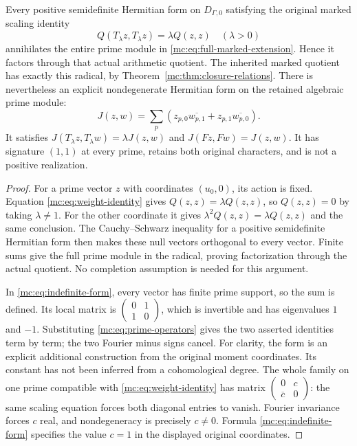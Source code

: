 \begin{proposition}
\label{mc:prop:positive-obstruction}
Every positive semidefinite Hermitian form on $D_{\Gamma,0}$
satisfying the original marked scaling identity
\[
 Q(T_\lambda z,T_\lambda z)=\lambda Q(z,z)
                       \quad(\lambda>0)
 \tag{MC27}\label{mc:eq:weight-identity}
\]
annihilates the entire prime module in
\eqref{mc:eq:full-marked-extension}. Hence it factors through that
actual arithmetic quotient. The inherited marked quotient has
exactly this radical, by Theorem~\ref{mc:thm:closure-relations}.
There is nevertheless an explicit nondegenerate Hermitian form
on the retained algebraic prime module:
\[
 J(z,w)=\sum_p\left(z_{p,0}\overline{w_{p,1}}
                       +z_{p,1}\overline{w_{p,0}}\right).
 \tag{MC28}\label{mc:eq:indefinite-form}
\]
It satisfies $J(T_\lambda z,T_\lambda w)=\lambda J(z,w)$
and $J(Fz,Fw)=J(z,w)$. It has signature $(1,1)$ at every
prime, retains both original characters, and is not a positive
realization.
\end{proposition}
\begin{proof}
For a prime vector $z$ with coordinates $(u_0,0)$, its action is
fixed. Equation
\eqref{mc:eq:weight-identity} gives $Q(z,z)=\lambda Q(z,z)$,
so $Q(z,z)=0$ by taking $\lambda\ne1$. For the other coordinate
it gives $\lambda^2Q(z,z)=\lambda Q(z,z)$ and the same
conclusion. The Cauchy--Schwarz inequality for a positive
semidefinite Hermitian form then makes these null vectors
orthogonal to every vector. Finite sums give the full prime
module in the radical, proving factorization through the actual
quotient. No completion assumption is needed for this argument.

In \eqref{mc:eq:indefinite-form}, every vector has finite prime
support, so the sum is defined. Its local matrix is
$\left(\begin{smallmatrix}0&1\\1&0\end{smallmatrix}\right)$,
which is invertible and has eigenvalues $1$ and $-1$.
Substituting \eqref{mc:eq:prime-operators} gives the two asserted
identities term by term; the two Fourier minus signs cancel.
For clarity, the form is an explicit additional construction
from the original moment coordinates. Its constant has not been
inferred from a cohomological degree. The whole family on one
prime compatible with \eqref{mc:eq:weight-identity} has matrix
$\left(\begin{smallmatrix}0&c\\\overline c&0\end{smallmatrix}\right)$:
the same scaling equation forces both diagonal entries to vanish.
Fourier invariance forces $c$ real, and nondegeneracy is precisely
$c\ne0$. Formula \eqref{mc:eq:indefinite-form} specifies the value
$c=1$ in the displayed original coordinates.
\end{proof}

